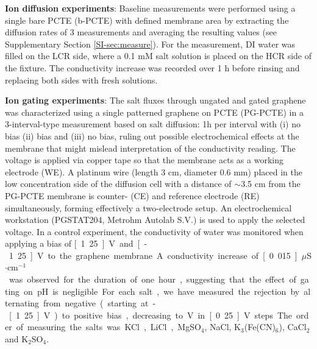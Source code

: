 \vspace{1em}
\noindent
\textbf{Ion diffusion experiments}: { Baseline measurements were
performed using a single bare PCTE (b-PCTE) with defined membrane area} by extracting the diffusion rates
of 3 measurements and averaging the resulting values (see
Supplementary Section \ref{SI-sec:measure}). For the measurement, DI water was filled on
the LCR side, where a 0.1 mM salt solution is placed on the HCR side
of the fixture. The conductivity increase was recorded over 1 h before
rinsing and replacing both sides with fresh solutions.

\vspace{1em}
\noindent
\textbf{Ion gating experiments}: 
{ The salt fluxes through ungated and gated graphene
was characterized using a single patterned graphene on PCTE (PG-PCTE)} 
in a 3-interval-type measurement based on salt diffusion: 1h per interval
with (i) no bias (ii) bias and (iii) no bias, ruling out possible
electrochemical effects at the membrane that might mislead
interpretation of the conductivity reading. The voltage is applied via
copper tape so that the membrane acts as a working electrode (WE). A
platinum wire (length 3 cm, diameter 0.6 mm) placed in the low
concentration side of the diffusion cell with a distance of $\sim$3.5 cm
from the PG-PCTE membrane is counter- (CE) and reference electrode
(RE) simultaneously, forming effectively a two-electrode setup. An
electrochemical workstation (PGSTAT204, Metrohm Autolab S.V.) is used
to apply the selected voltage.
{ In a control experiment, the conductivity of water was monitored when applying a bias of \unit[1.25]{V} and \unit[-1.25]{V} to the graphene membrane. A conductivity increase of \unit[0.015]{$\mu$S$\cdot$cm$^{-1}$} was observed for the duration of one hour, suggesting that the effect of gating on pH is negligible.

  For each salt, we have measured the rejection by alternating from
  negative (starting at -\unit[1.25]{V}) to positive bias, decreasing
  to \unit[0]{V} in \unit[0.25]{V} steps. The order of measuring the
  salts was KCl, LiCl, MgSO$_4$, NaCl, K$_3$(Fe(CN)$_6$), CaCl$_2$ and
  K$_2$SO$_4$.}

